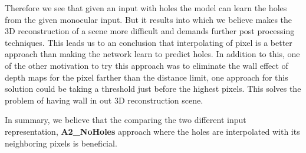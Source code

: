 Therefore we see that given an input with holes the model can learn the holes from the given monocular input. But it results into  which we believe makes the 3D reconstruction of a scene more difficult and demands further post processing techniques. This leads us to an conclusion that interpolating of pixel is a better approach than making the network learn to predict holes. In addition to this, one of the other motivation to try this approach was to eliminate the wall effect of depth maps  for the pixel farther than the distance limit, one approach for this solution could be taking a threshold just before the highest pixels. This solves the problem of having wall in out 3D reconstruction scene.

In summary, we believe that the comparing the two different input representation, \textbf{A2\_NoHoles} approach where the holes are interpolated with its neighboring pixels is beneficial.





